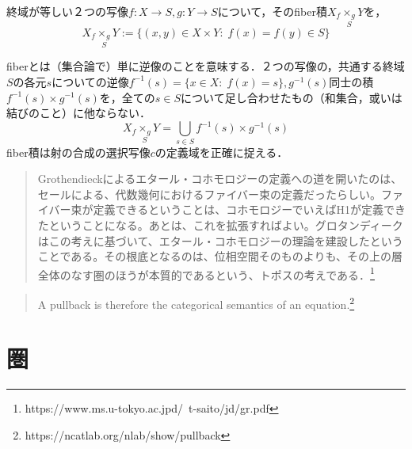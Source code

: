 \documentclass[uplatex, 12pt, a4paper, dvipdfmx]{jsarticle}
\begin{document}
\begin{shadebox}\begin{definition}終域が等しい２つの写像$f:X\longrightarrow S, g:Y\longrightarrow S$について，その\rm{fiber積}$X_f\underset{S}{\times_g}Y$を，$$X_f\underset{S}{\times_g}Y:=\{ (x,y)\in X\times Y:\; f(x)=f(y)\in S \}$$  \end{definition}\end{shadebox}
fiberとは（集合論で）単に逆像のことを意味する．２つの写像の，共通する終域$S$の各元$s$についての逆像$f^{-1}(s)=\{ x\in X:\; f(x)=s \},g^{-1}(s)$同士の積$f^{-1}(s)\times g^{-1}(s)$を，全ての$s\in S$について足し合わせたもの（和集合，或いは結びのこと）に他ならない．$$X_f\underset{S}{\times_g}Y=\bigcup_{s\in S}f^{-1}(s)\times g^{-1}(s)$$
fiber積は射の合成の選択写像$c$の定義域を正確に捉える．

\begin{quote}
    Grothendieckによるエタール・コホモロジーの定義への道を開いたのは、セールによる、代数幾何におけるファイバー束の定義だったらしい。ファイバー束が定義できるということは、コホモロジーでいえばH1が定義できたということになる。あとは、これを拡張すればよい。グロタンディークはこの考えに基づいて、エタール・コホモロジーの理論を建設したということである。その根底となるのは、位相空間そのものよりも、その上の層全体のなす圏のほうが本質的であるという、トポスの考えである．\footnote{https://www.ms.u-tokyo.ac.jpd/~t-saito/jd/gr.pdf}
\end{quote}
\begin{quote}
    A pullback is therefore the categorical semantics of an equation.\footnote{https://ncatlab.org/nlab/show/pullback}
\end{quote}

\clearpage


\section{圏}
\end{document}
